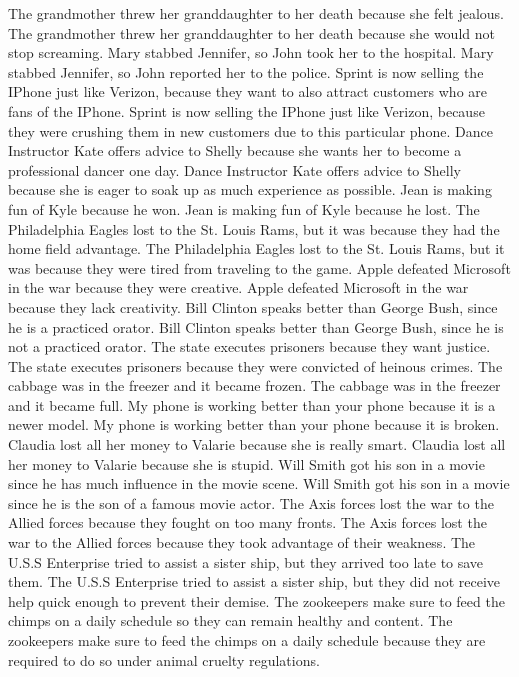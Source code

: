 \documentclass{article}
\begin{document}
\begin{enumerate}
	The grandmother threw her granddaughter to her death because she felt jealous.
	The grandmother threw her granddaughter to her death because she would not stop screaming.
	Mary stabbed Jennifer, so John took her to the hospital.
	Mary stabbed Jennifer, so John reported her to the police.
	Sprint is now selling the IPhone just like Verizon, because they want to also attract customers who are fans of the IPhone.
	Sprint is now selling the IPhone just like Verizon, because they were crushing them in new customers due to this particular phone.
	Dance Instructor Kate offers advice to Shelly because she wants her to become a professional dancer one day.
	Dance Instructor Kate offers advice to Shelly because she is eager to soak up as much experience as possible.
	Jean is making fun of Kyle because he won.
	Jean is making fun of Kyle because he lost.
	The Philadelphia Eagles lost to the St. Louis Rams, but it was because they had the home field advantage.
	The Philadelphia Eagles lost to the St. Louis Rams, but it was because they were tired from traveling to the game.
	Apple defeated Microsoft in the war because they were creative.
	Apple defeated Microsoft in the war because they lack creativity.
	Bill Clinton speaks better than George Bush, since he is a practiced orator.
	Bill Clinton speaks better than George Bush, since he is not a practiced orator.
	The state executes prisoners because they want justice.
	The state executes prisoners because they were convicted of heinous crimes.
	The cabbage was in the freezer and it became frozen.
	The cabbage was in the freezer and it became full.
	My phone is working better than your phone because it is a newer model.
	My phone is working better than your phone because it is broken.
	Claudia lost all her money to Valarie because she is really smart.
	Claudia lost all her money to Valarie because she is stupid.
	Will Smith got his son in a movie since he has much influence in the movie scene.
	Will Smith got his son in a movie since he is the son of a famous movie actor.
	The Axis forces lost the war to the Allied forces because they fought on too many fronts.
	The Axis forces lost the war to the Allied forces because they took advantage of their weakness.
	The U.S.S Enterprise tried to assist a sister ship, but they arrived too late to save them.
	The U.S.S Enterprise tried to assist a sister ship, but they did not receive help quick enough to prevent their demise.
	The zookeepers make sure to feed the chimps on a daily schedule so they can remain healthy and content.
	The zookeepers make sure to feed the chimps on a daily schedule because they are required to do so under animal cruelty regulations.

\end{enumerate}
\end{document}
